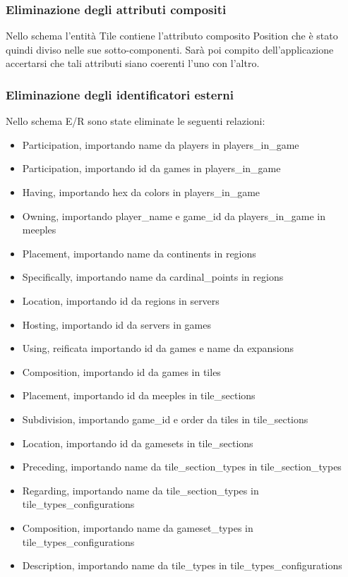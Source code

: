 \subsubsection*{Eliminazione degli attributi compositi}
Nello schema l'entità Tile contiene l'attributo composito Position che è stato quindi diviso nelle sue sotto-componenti. Sarà poi compito dell'applicazione accertarsi che tali attributi siano coerenti l'uno con l'altro.

\subsubsection*{Eliminazione degli identificatori esterni}
Nello schema E/R sono state eliminate le seguenti relazioni:
\begin{itemize}
    \item Participation, importando name da players in players\_in\_game
    \item Participation, importando id da games in players\_in\_game
    \item Having, importando hex da colors in players\_in\_game
    \item Owning, importando player\_name e game\_id da players\_in\_game in meeples
    \item Placement, importando name da continents in regions
    \item Specifically, importando name da cardinal\_points in regions
    \item Location, importando id da regions in servers
    \item Hosting, importando id da servers in games
    \item Using, reificata importando id da games e name da expansions
    \item Composition, importando id da games in tiles
    \item Placement, importando id da meeples in tile\_sections
    \item Subdivision, importando game\_id e order da tiles in tile\_sections
    \item Location, importando id da gamesets in tile\_sections
    \item Preceding, importando name da tile\_section\_types in tile\_section\_types
    \item Regarding, importando name da tile\_section\_types in tile\_types\_configurations
    \item Composition, importando name da gameset\_types in tile\_types\_configurations
    \item Description, importando name da tile\_types in tile\_types\_configurations

\end{itemize}
